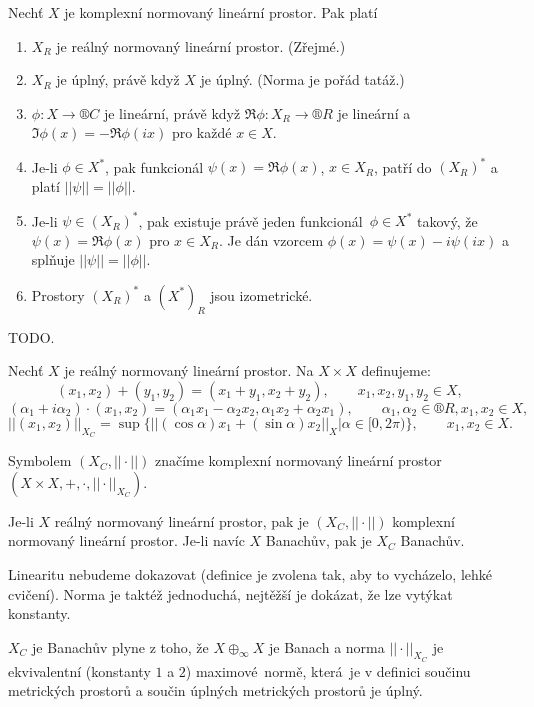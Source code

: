 \documentclass[12pt]{article}					%
\begin{document}
\begin{veta}
	Nechť $X$ je komplexní normovaný lineární prostor. Pak platí
	
	\begin{enumerate}
		\item $X_R$ je reálný normovaný lineární prostor. (Zřejmé.)
		\item $X_R$ je úplný, právě když $X$ je úplný. (Norma je pořád tatáž.)
		\item $\phi: X \rightarrow ®C$ je lineární, právě když $\Re \phi: X_R \rightarrow ®R$ je lineární a $\Im \phi(x) = -\Re \phi(ix)$ pro každé $x \in X$.
		\item Je-li $\phi \in X^*$, pak funkcionál $\psi(x) = \Re \phi(x)$, $x \in X_R$, patří do $(X_R)^*$ a platí $||\psi|| = ||\phi||$.
		\item Je-li $\psi \in (X_R)^*$, pak existuje právě jeden funkcionál $\phi \in X^*$ takový, že $\psi(x) = \Re \phi(x)$ pro $x \in X_R$. Je dán vzorcem $\phi(x) = \psi(x) - i\psi(ix)$ a splňuje $||\psi|| = ||\phi||$.
		\item Prostory $(X_R)^*$ a $(X^*)_R$ jsou izometrické.
	\end{enumerate}

	\begin{dukazin}
		TODO.
	\end{dukazin}
\end{veta}

\begin{definice}
	Nechť $X$ je reálný normovaný lineární prostor. Na $X \times X$ definujeme:
	$$ (x_1, x_2) + (y_1, y_2) = (x_1 + y_1, x_2 + y_2), \qquad x_1, x_2, y_1, y_2 \in X, $$
	$$ (\alpha_1 + i\alpha_2)·(x_1, x_2) = (\alpha_1x_1 - \alpha_2x_2, \alpha_1x_2 + \alpha_2 x_1), \qquad \alpha_1, \alpha_2 \in ®R, x_1, x_2 \in X, $$
	$$ ||(x_1, x_2)||_{X_C} = \sup\{||(\cos \alpha)x_1 + (\sin \alpha)x_2||_X | \alpha \in [0, 2\pi)\}, \qquad x_1, x_2 \in X. $$

	Symbolem $(X_C, ||·||)$ značíme komplexní normovaný lineární prostor $(X \times X, +, ·, ||·||_{X_C})$.
\end{definice}

\begin{veta}[Komplexifikace]
	Je-li $X$ reálný normovaný lineární prostor, pak je $(X_C, ||·||)$ komplexní normovaný lineární prostor. Je-li navíc $X$ Banachův, pak je $X_C$ Banachův.

	\begin{dukazin}
		Linearitu nebudeme dokazovat (definice je zvolena tak, aby to vycházelo, lehké cvičení). Norma je taktéž jednoduchá, nejtěžší je dokázat, že lze vytýkat konstanty.

		$X_C$ je Banachův plyne z toho, že $X \oplus_∞ X$ je Banach a norma $||·||_{X_C}$ je ekvivalentní (konstanty $1$ a $2$) maximové normě, která je v definici součinu metrických prostorů a součin úplných metrických prostorů je úplný.
	\end{dukazin}
\end{veta}
\end{document}
